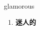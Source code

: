 
\begin{frame}
{\huge glamorous}
\begin{center}
\begin{enumerate}\Large
  \item \textbf{迷人的}
\end{enumerate}
\end{center}
\end{frame}

